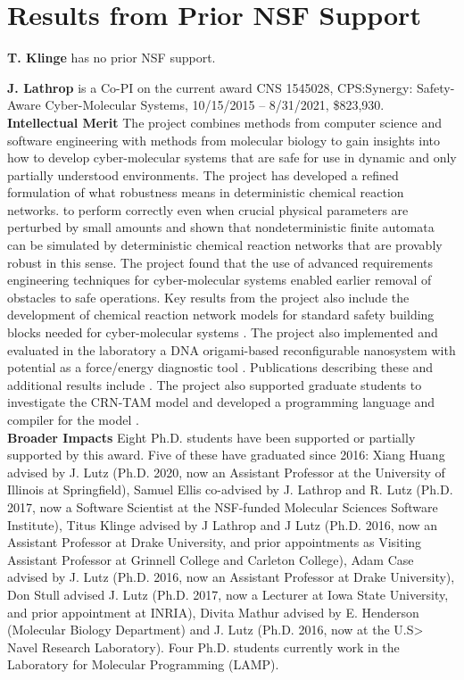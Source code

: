 
\section{Results from Prior NSF Support}
\label{sec:prior_nsf_support}

{\bf T. Klinge} has no prior NSF support.
\vspace{1em}

\noindent
{\bf J. Lathrop} is a Co-PI on the current award CNS 1545028, CPS:Synergy: Safety-Aware Cyber-Molecular Systems, 10/15/2015 -- 8/31/2021, \$823,930. \\
{\bf Intellectual Merit}
The project combines methods from computer science and software engineering with methods from molecular biology to gain insights into how to develop cyber-molecular systems that are safe for use in dynamic and only partially understood environments.
The project has developed a refined formulation of what robustness means in deterministic chemical reaction networks. to  perform correctly even when crucial physical parameters are perturbed by small amounts and shown that nondeterministic finite automata can be simulated by deterministic chemical reaction networks that are provably robust in this sense.  
The project found that the use of advanced requirements engineering techniques for cyber-molecular systems enabled earlier removal of obstacles to safe operations.  Key results from the project also include the development of chemical reaction network models for standard safety building blocks needed for cyber-molecular systems \cite{jKlLaLu20,  cElLaLu17, cElKlLa17, jEKLLLM17}.
The project also implemented and evaluated in the laboratory a DNA origami-based reconfigurable nanosystem with potential as a force/energy diagnostic tool \cite{jMatHen16, oMath16}.    Publications describing these and additional results include \cite{cKlin16,  cHuaStu16, jCaLuSt18, cElKlLa17,  jHKLLL18}.
The project also supported graduate students to investigate the CRN-TAM model and developed a programming language and compiler for the model \cite{ALCH}. \\
{\bf Broader Impacts}
Eight Ph.D. students have been supported or partially supported by this award. Five of these have graduated since 2016:  Xiang Huang advised by J. Lutz (Ph.D. 2020, now an Assistant Professor at the University of Illinois at Springfield), Samuel Ellis co-advised by J. Lathrop and R. Lutz (Ph.D. 2017, now a Software Scientist at the NSF-funded Molecular Sciences Software Institute), Titus Klinge advised by J Lathrop and J Lutz  (Ph.D. 2016, now an Assistant Professor at Drake University, and prior appointments as Visiting Assistant Professor at Grinnell College and Carleton College), Adam Case advised by J. Lutz (Ph.D. 2016, now an Assistant Professor at Drake University), Don Stull advised J. Lutz (Ph.D. 2017, now a Lecturer at Iowa State University, and prior appointment at INRIA), Divita Mathur advised by E. Henderson (Molecular Biology Department) and J. Lutz (Ph.D. 2016, now at the U.S> Navel Research Laboratory).  Four Ph.D. students currently work in the Laboratory for Molecular Programming (LAMP).  

